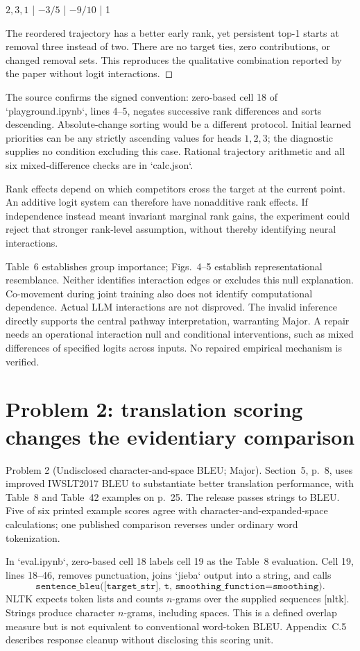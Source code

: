 \documentclass[10pt]{article}
\begin{document}
\(2,3,1\) | \(-3/5\) | \(-9/10\) | 1\par
The reordered trajectory has a better early rank, yet persistent top-1 starts at removal three instead of two. There are no target ties, zero contributions, or changed removal sets. This reproduces the qualitative combination reported by the paper without logit interactions. ◻\par
The source confirms the signed convention: zero-based cell 18 of `playground.ipynb`, lines 4–5, negates successive rank differences and sorts descending. Absolute-change sorting would be a different protocol. Initial learned priorities can be any strictly ascending values for heads \(1,2,3\); the diagnostic supplies no condition excluding this case. Rational trajectory arithmetic and all six mixed-difference checks are in `calc.json`.\par
Rank effects depend on which competitors cross the target at the current point. An additive logit system can therefore have nonadditive rank effects. If independence instead meant invariant marginal rank gains, the experiment could reject that stronger rank-level assumption, without thereby identifying neural interactions.\par
Table 6 establishes group importance; Figs. 4–5 establish representational resemblance. Neither identifies interaction edges or excludes this null explanation. Co-movement during joint training also does not identify computational dependence. Actual LLM interactions are not disproved. The invalid inference directly supports the central pathway interpretation, warranting Major. A repair needs an operational interaction null and conditional interventions, such as mixed differences of specified logits across inputs. No repaired empirical mechanism is verified.\par
\section*{Problem 2: translation scoring changes the evidentiary comparison}
Problem 2 (Undisclosed character-and-space BLEU; Major).  Section 5, p. 8, uses improved IWSLT2017 BLEU to substantiate better translation performance, with Table 8 and Table 42 examples on p. 25. The release passes strings to BLEU. Five of six printed example scores agree with character-and-expanded-space calculations; one published comparison reverses under ordinary word tokenization.\par
In `eval.ipynb`, zero-based cell 18 labels cell 19 as the Table 8 evaluation. Cell 19, lines 18–46, removes punctuation, joins `jieba` output into a string, and calls \[\texttt{sentence\_bleu([target\_str], t, smoothing\_function=smoothing)}.\] NLTK expects token lists and counts \(n\)-grams over the supplied sequences [nltk]. Strings produce character \(n\)-grams, including spaces. This is a defined overlap measure but is not equivalent to conventional word-token BLEU. Appendix C.5 describes response cleanup without disclosing this scoring unit.\par
\end{document}

